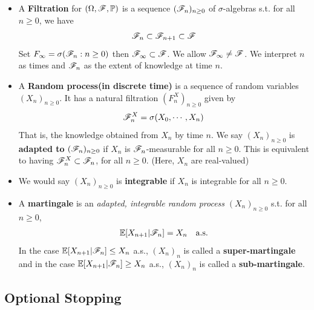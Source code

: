 \documentclass[10pt,a4paper]{report}
\begin{document}
\begin{itemize}
\item A \textbf{Filtration} for $(\Omega, \mathscr{F}, \mathbb{P})$ is a sequence $(\mathscr{F}_n)_{n\geq 0}$ of $\sigma$-algebras s.t. for all $n \geq 0$, we have
\begin{align*}
\mathscr{F}_n\subset \mathscr{F}_{n+1} \subset \mathscr{F}
\end{align*}
Set $F_{\infty} = \sigma(\mathscr{F}_n:n\geq 0)$ then $\mathscr{F}_{\infty} \subset \mathscr{F}$. We allow $\mathscr{F}_{\infty} \neq \mathscr{F}$. We interpret $n$ as times and $\mathscr{F}_n$ as the extent of knowledge at time $n$.

\item A \textbf{Random process(in discrete time)} is a sequence of random variables $(X_n)_{n\geq 0}$. It has a natural filtration $(F_n^X)_{n\geq 0}$ given by
\begin{align*}
\mathscr{F}_n^X = \sigma(X_0, \cdots, X_n)
\end{align*}
That is, the knowledge obtained from $X_n$ by time $n$. We say $(X_n)_{n\geq 0}$ is \textbf{adapted to} $(\mathscr{F}_n)_{n\geq 0}$ if $X_n$ is $\mathscr{F}_n$-measurable for all $n\geq 0$. This is equivalent to having $\mathscr{F}_n^X \subset \mathscr{F}_n$, for all $n \geq 0$. (Here, $X_n$ are real-valued) 

\item We would say $(X_n)_{n\geq 0}$ is \textbf{integrable} if $X_n$ is integrable for all $n\geq 0$.

\item A \textbf{martingale} is an \emph{adapted, integrable random process} $(X_n)_{n\geq 0}$ s.t. for all $n\geq 0$,
\begin{align*}
\mathbb{E}[X_{n+1} |\mathscr{F}_n] = X_n \quad \text{a.s.}
\end{align*}
In the case $\mathbb{E}[X_{n+1} |\mathscr{F}_n] \leq X_n$ a.s., $(X_n)_n$ is called a \textbf{super-martingale} and in the case $\mathbb{E}[X_{n+1} |\mathscr{F}_n] \geq X_n $ a.s., $(X_n)_n$ is called a \textbf{sub-martingale}.
\end{itemize}

\newcommand{\randp}{(X_n)_{n \geq 0}} %

\subsection*{Optional Stopping}
\end{document}
